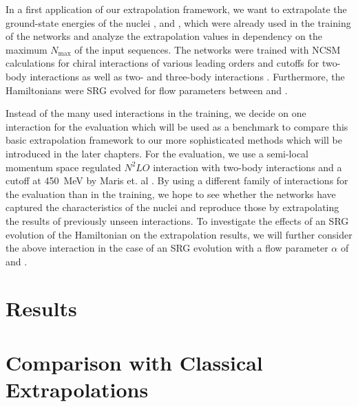 In a first application of our extrapolation framework, we want to extrapolate the ground-state energies of the nuclei ,  and , which were already used in the training of the networks and analyze the extrapolation values in dependency on the maximum $N_\mathrm{max}$ of the input sequences. The networks were trained with NCSM calculations for chiral interactions of various leading orders and cutoffs for two-body interactions \cite{entemmachleidt} as well as two- and three-body interactions \cite{HUTHER2020135651}. Furthermore, the Hamiltonians were SRG evolved for flow parameters between  and .

Instead of the many used interactions in the training, we decide on one interaction for the evaluation which will be used as a benchmark to compare this basic extrapolation framework to our more sophisticated methods which will be introduced in the later chapters. For the evaluation, we use a semi-local momentum space regulated $N^2LO$ interaction with two-body interactions and a cutoff at \SI{450}{\mega\electronvolt} by Maris et. al \cite{smsquelle}. By using a different family of interactions for the evaluation than in the training, we hope to see whether the networks have captured the characteristics of the nuclei and reproduce those by extrapolating the results of previously unseen interactions. To investigate the effects of an SRG evolution of the Hamiltonian on the extrapolation results, we will further consider the above interaction in the case of an SRG evolution with a flow parameter $\alpha$ of  and .

\section{Results}

\section{Comparison with Classical Extrapolations}

